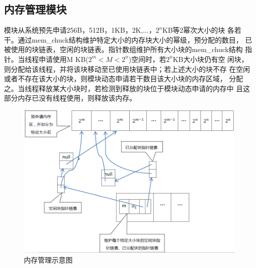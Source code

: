 
%
\subsection{内存管理模块}
		模块从系统预先申请256B，512B，1KB，2K,$\ldots$，$2^n$KB等2幂次大小的块
		各若干。通过mem\_chuck结构维护特定大小的内存块大小的幂级，预分配的数目，
		已被使用的块链表，空闲的块链表。指针数组维护所有大小块的mem\_chuck结构
		指针。当线程申请使用M KB($2^m < M < 2^n$)空间时，若$2^n$KB大小块仍有空
		闲块，则分配给该线程，并将该块移动至已使用块链表中；若上述大小的块不存
		在空闲或者不存在该大小的块，则模块动态申请若干数目该大小块的内存区域，
		分配之。当线程释放某大小块时，若检测到释放的块位于模块动态申请的内存中
		且这部分内存已没有线程使用，则释放该内存。
\begin{figure}[H]
\centering
\includegraphics[keepaspectratio,scale=0.5]{pitures/mm.png}
\caption{内存管理示意图}
\end{figure}


